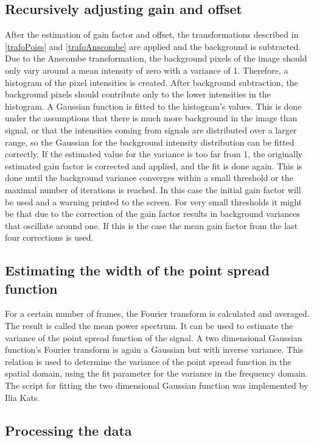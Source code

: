 \subsection{Recursively adjusting gain and offset}
After the estimation of gain factor and offset, the transformations described in \ref{trafoPoiss} and \ref{trafoAnscombe} are applied and the background is subtracted.\newline
Due to the Anscombe transformation, the background pixels of the image should only vary around a mean intensity of zero with a variance of 1. Therefore, a histogram of the pixel intensities is created. After background subtraction, the background pixels should contribute only to the lower intensities in the histogram. A Gaussian function is fitted to the histogram's values. This is done under the assumptions that there is much more background in the image than signal, or that the intensities coming from signals are distributed over a larger range, so the Gaussian for the background intensity distribution can be fitted correctly.\newline
If the estimated value for the variance is too far from 1, the originally estimated gain factor is corrected and applied, and the fit is done again. This is done until the background variance converges within a small threshold or the maximal number of iterations is reached. In this case the initial gain factor will be used and a warning printed to the screen.\newline
For very small thresholds it might be that due to the correction of the gain factor results in background variances that oscillate around one. If this is the case the mean gain factor from the last four corrections is used.
\subsection{Estimating the width of the point spread function}
For a certain number of frames, the Fourier transform is calculated and averaged. The result is called the mean power spectrum. It can be used to estimate the variance of the point spread function of the signal. A two dimensional Gaussian function's Fourier transform is again a Gaussian but with inverse variance. This relation is used to determine the variance of the point spread function in the spatial domain, using the fit parameter for the variance in the frequency domain.\newline
The script for fitting the two dimensional Gaussian function was implemented by Ilia Kats.
\subsection{Processing the data}
